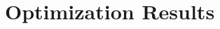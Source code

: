 \documentclass[../mthe-493-final-project.tex]{subfiles}
\begin{document}
    \chapter{Optimization Results}
    \label{ch:}

    \section{}
    \label{sec:}

    
\end{document}
